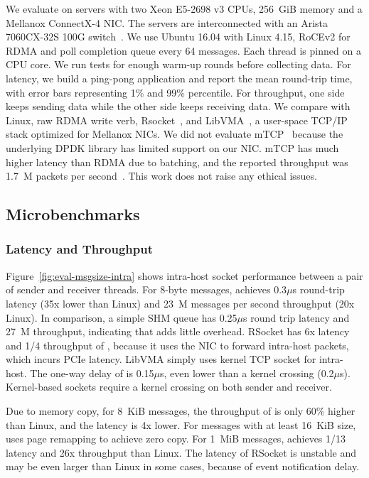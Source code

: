 We evaluate \sys on servers with two Xeon E5-2698 v3 CPUs, 256~GiB memory and a Mellanox ConnectX-4 NIC. The servers are interconnected with an Arista 7060CX-32S 100G switch~\cite{arista-7060cx}. We use Ubuntu 16.04 with Linux 4.15, RoCEv2 for RDMA and poll completion queue every 64 messages.
Each thread is pinned on a CPU core. We run tests for enough warm-up rounds before collecting data.
For latency, we build a ping-pong application and report the mean round-trip time, with error bars representing 1\% and 99\% percentile.
For throughput, one side keeps sending data while the other side keeps receiving data.
We compare with Linux, raw RDMA write verb, Rsocket~\cite{rsockets}, and LibVMA~\cite{libvma}, a user-space TCP/IP stack optimized for Mellanox NICs.
We did not evaluate mTCP~\cite{jeong2014mtcp} because the underlying DPDK library has limited support on our NIC. mTCP has much higher latency than RDMA due to batching, and the reported throughput was 1.7~M packets per second~\cite{kalia2018datacenter}. %
This work does not raise any ethical issues.

\subsection{Microbenchmarks}
\label{subsec:microbenchmark}

\subsubsection{Latency and Throughput}
\quad



Figure~\ref{fig:eval-msgsize-intra} shows intra-host socket performance between a pair of sender and receiver threads.
For 8-byte messages, \sys achieves 0.3$\mu$s round-trip latency (35x lower than Linux) and 23~M messages per second throughput (20x Linux).
In comparison, a simple SHM queue has 0.25$\mu$s round trip latency and 27~M throughput, indicating that \sys adds little overhead.
RSocket has 6x latency and 1/4 throughput of \sys{}, because it uses the NIC to forward intra-host packets, which incurs PCIe latency.
LibVMA simply uses kernel TCP socket for intra-host.
The one-way delay of \sys{} is 0.15$\mu$s, even lower than a kernel crossing (0.2$\mu$s). Kernel-based sockets require a kernel crossing on both sender and receiver.

Due to memory copy, for 8~KiB messages, the throughput of \sys is only 60\% higher than Linux, and the latency is 4x lower. For messages with at least 16~KiB size, \sys uses page remapping to achieve zero copy.
For 1~MiB messages, \sys achieves 1/13 latency and 26x throughput than Linux.
The latency of RSocket is unstable and may be even larger than Linux in some cases, because of event notification delay.


